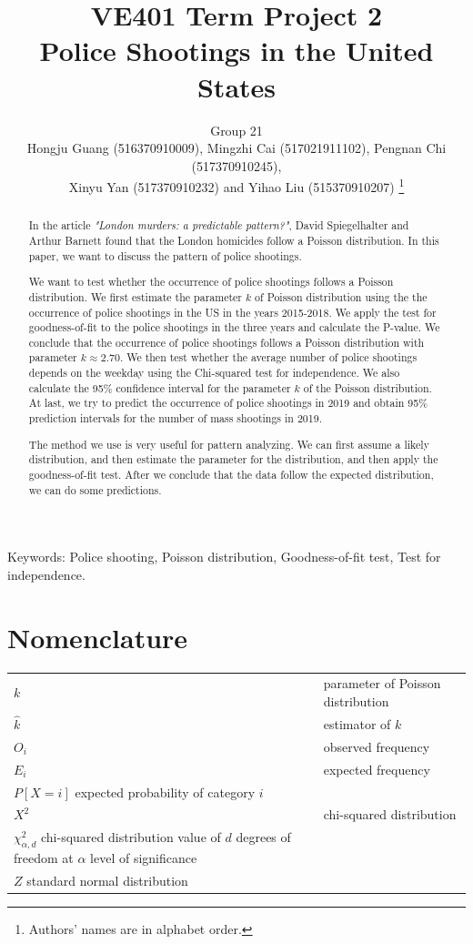 \documentclass[conf]{new-aiaa}
\title{VE401 Term Project 2\\
Police Shootings in the United States}
\author{Group 21\\
Hongju Guang (516370910009),
Mingzhi Cai (517021911102),
Pengnan Chi (517370910245),\\
Xinyu Yan (517370910232) and
Yihao Liu (515370910207)
\footnote{Authors' names are in alphabet order.}
}
\affil{University OF Michigan - Shanghai Jiao Tong University Joint Institute, Shanghai, China}
\begin{document}
\maketitle

\begin{abstract}
In the article \textit{"London murders: a predictable pattern?"}, David Spiegelhalter and Arthur Barnett found that the London homicides follow a Poisson distribution. In this paper, we want to discuss the pattern of police shootings.

We want to test whether the occurrence of police shootings follows a Poisson distribution. We first estimate the parameter $k$ of Poisson distribution using the the occurrence of police shootings in the US in the years 2015-2018. We apply the test for goodness-of-fit to the police shootings in the three years and calculate the P-value. We conclude that the occurrence of police shootings follows a Poisson distribution with parameter $k\approx2.70$. We then test whether the average number of police shootings depends on the weekday using the Chi-squared test for independence. We also calculate the 95\% confidence interval for the parameter $k$ of the Poisson distribution. At last, we try to predict the occurrence of police shootings in 2019 and obtain 95\% prediction intervals for the number of mass shootings in 2019.

The method we use is very useful for pattern analyzing. We can first assume a likely distribution, and then estimate the parameter for the distribution, and then apply the goodness-of-fit test. After we conclude that the data follow the expected distribution, we can do some predictions.


    
\end{abstract}

\vspace{5cm}
\begin{center}
Keywords: Police shooting, Poisson distribution, Goodness-of-fit test, Test for independence.
\end{center}

\newpage

\tableofcontents
\newpage


\section{Nomenclature}

{\renewcommand\arraystretch{1.0}
\noindent\begin{longtable*}{@{}l @{\quad=\quad} l@{}}
$k$ & parameter of Poisson distribution \\
$\hat{k}$ & estimator of $k$ \\
$O_i$ & observed frequency \\
$E_i$ & expected frequency \\
$P[X=i]$ expected probability of category $i$ \\
$X^2$ & chi-squared distribution \\
$\chi^2_{\alpha,d}$ chi-squared distribution value of $d$ degrees of freedom at $\alpha$ level of significance \\
$Z$ standard normal distribution
\end{longtable*}}
\end{document}
